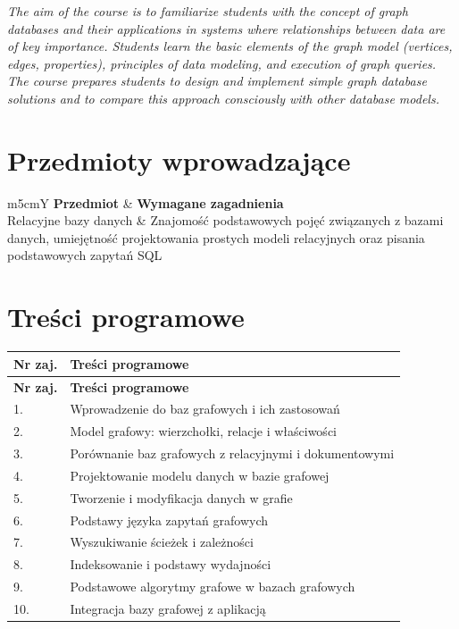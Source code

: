 \documentclass[12pt, a4paper]{article}
\newcommand{\thdrule}{\noalign{\global\setlength{\extrarowheight}{0pt}}}
\newcommand{\thdend}{\noalign{\global\setlength{\extrarowheight}{3pt}}}
\begin{document}
\textit{The aim of the course is to familiarize students with the concept of graph databases and their applications in systems where relationships between data are of key importance. Students learn the basic elements of the graph model (vertices, edges, properties), principles of data modeling, and execution of graph queries. The course prepares students to design and implement simple graph database solutions and to compare this approach consciously with other database models.}


\section{Przedmioty wprowadzające}

{\scriptsize
\begin{tabularx}{\textwidth}{m{5cm}Y}
\thdrule\toprule
{} {\color{white}\textbf{Przedmiot}} & {\color{white}\textbf{Wymagane zagadnienia}} \\
\midrule\thdend
   Relacyjne bazy danych & Znajomość podstawowych pojęć związanych z bazami danych, umiejętność projektowania prostych modeli relacyjnych oraz pisania podstawowych zapytań SQL \\
\bottomrule
\end{tabularx}}

\section{Treści programowe}

{\scriptsize
\begin{longtable}{m{1.5cm}m{14.5cm}}
\thdrule\toprule
\rowcolor{pjatkRed} {\color{white}\textbf{Nr zaj.}} & {\color{white}\textbf{Treści programowe}} \\
\midrule\thdend
\endfirsthead
\thdrule\toprule
\rowcolor{pjatkRed} {\color{white}\textbf{Nr zaj.}} & {\color{white}\textbf{Treści programowe}} \\
\midrule\thdend
\endhead
  \rowcolor{tableRowLight} 1. & Wprowadzenie do baz grafowych i ich zastosowań \\
  \rowcolor{tableRowAlt} 2. & Model grafowy: wierzchołki, relacje i właściwości \\
  \rowcolor{tableRowLight} 3. & Porównanie baz grafowych z relacyjnymi i dokumentowymi \\
  \rowcolor{tableRowAlt} 4. & Projektowanie modelu danych w bazie grafowej \\
  \rowcolor{tableRowLight} 5. & Tworzenie i modyfikacja danych w grafie \\
  \rowcolor{tableRowAlt} 6. & Podstawy języka zapytań grafowych \\
  \rowcolor{tableRowLight} 7. & Wyszukiwanie ścieżek i zależności \\
  \rowcolor{tableRowAlt} 8. & Indeksowanie i podstawy wydajności \\
  \rowcolor{tableRowLight} 9. & Podstawowe algorytmy grafowe w bazach grafowych \\
  \rowcolor{tableRowAlt} 10. & Integracja bazy grafowej z aplikacją \\
\bottomrule
\end{longtable}}
\end{document}
